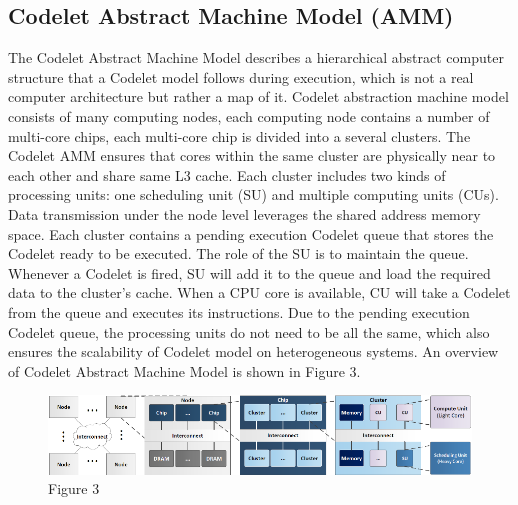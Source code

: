 \subsection*{Codelet Abstract Machine Model (AMM)} The Codelet Abstract Machine Model describes a hierarchical abstract computer structure that a Codelet model follows during execution, which is not a real computer architecture but rather a map of it. Codelet abstraction machine model consists of many computing nodes, each computing node contains a number of multi-core chips, each multi-core chip is divided into a several clusters. The Codelet AMM ensures that cores within the same cluster are physically near to each other and share same L3 cache. Each cluster includes two kinds of processing units: one scheduling unit (SU) and multiple computing units (CUs). Data transmission under the node level leverages the shared address memory space. Each cluster contains a pending execution Codelet queue that stores the Codelet ready to be executed. The role of the SU is to maintain the queue. Whenever a Codelet is fired, SU will add it to the queue and load the required data to the cluster's cache. When a CPU core is available, CU will take a Codelet from the queue and executes its instructions. Due to the pending execution Codelet queue, the processing units do not need to be all the same, which also ensures the scalability of Codelet model on heterogeneous systems. An overview of Codelet Abstract Machine Model is shown in Figure 3.

\begin{figure}[h]
\caption{Figure 3}
\centering
\includegraphics[width=1\textwidth]{Fig/figure3.png}
\end{figure}

